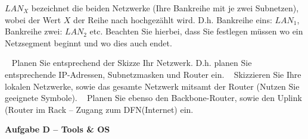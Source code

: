 \documentclass[paper=a4,fontsize=11pt]{scrartcl}%
\numberwithin{equation}{section}
\begin{document}
$LAN_X$ bezeichnet die beiden Netzwerke (Ihre Bankreihe mit je zwei Subnetzen), wobei der Wert $X$ der Reihe nach hochgezählt wird. D.h. Bankreihe eins: $LAN_{1}$, Bankreihe zwei: $LAN_{2}$ etc. Beachten Sie hierbei, dass Sie festlegen müssen wo ein Netzsegment beginnt und wo dies auch endet. 
\begin{tasks}
		\task~ Planen Sie entsprechend der Skizze Ihr Netzwerk. D.h. planen Sie entsprechende IP-Adressen, Subnetzmasken und Router ein.
		\task~ Skizzieren Sie Ihre lokalen Netzwerke, sowie das gesamte Netzwerk mitsamt der Router (Nutzen Sie geeignete Symbole).
		\task~ Planen Sie ebenso den Backbone-Router, sowie den Uplink (Router im Rack -- Zugang zum DFN(Internet) ein.
	\end{tasks}

\begin{center}
\Large{\textbf{Aufgabe D -- Tools \& OS}}
\end{center}
\vskip0.25in
\end{document}
